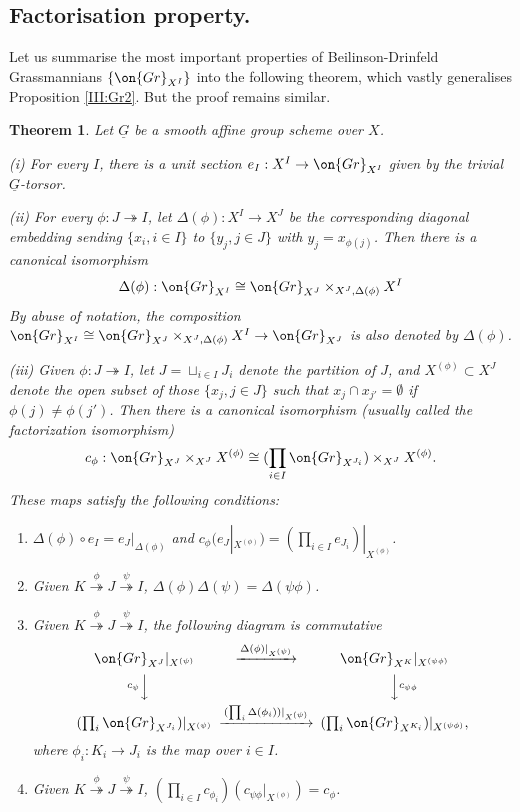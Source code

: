 \documentclass[]{pcmi}
\theoremstyle{plain}
\newtheorem{thm}[equation]{Theorem}
\theoremstyle{remark}
\theoremstyle{definition}
\newcommand{\Gr}{{\on{Gr}}}
\begin{document}
\subsection{Factorisation property.}
Let us summarise the most important properties of Beilinson-Drinfeld Grassmannians $\{\Gr_{X^I}\}$ into the following theorem, which vastly generalises Proposition \ref{III:Gr2}. But the proof remains similar.
\begin{thm}\label{III:factorization} Let $\underline G$ be a smooth affine group scheme over $X$.

(i) For every $I$, there is a unit section $e_I: X^I\to \Gr_{X^I}$ given by the trivial $\underline G$-torsor.

(ii) For every $\phi: J\twoheadrightarrow I$, let $\Delta(\phi):X^I\to X^J$ be the corresponding diagonal embedding sending $\{x_i, i\in I\}$ to $\{y_j, j\in J\}$ with $y_j=x_{\phi(j)}$. Then
there is a canonical isomorphism
\begin{equation}\label{BD restriction}
\Delta(\phi):\Gr_{X^I}\cong \Gr_{X^J}\times_{X^J,\Delta(\phi)}X^I
\end{equation}
By abuse of notation, the composition $\Gr_{X^I}\cong \Gr_{X^J}\times_{X^J,\Delta(\phi)}X^I\to \Gr_{X^J}$ is also denoted by $\Delta(\phi)$.

(iii) Given $\phi: J\twoheadrightarrow  I$, let $J=\sqcup_{i\in I}J_i$ denote the partition of $J$, and $X^{(\phi)}\subset X^J$ denote the open subset of those $\{x_j, j\in J\}$ such that $x_{j}\cap x_{j'}=\emptyset$ if $\phi(j)\neq \phi(j')$. Then there is a canonical isomorphism (usually called the factorization isomorphism)
\begin{equation}\label{BD factorization}
c_\phi: \Gr_{X^J}\times_{X^J}X^{(\phi)}\cong (\prod_{i\in I}\Gr_{X^{J_i}})\times_{X^J}X^{(\phi)}.
\end{equation}
These maps satisfy the following conditions:
\begin{enumerate}
\item $\Delta(\phi)\circ e_I=e_J|_{\Delta(\phi)}$ and $c_\phi (e_J|_{X^{(\phi)}})=(\prod_{i\in I} e_{J_i})|_{X^{(\phi)}}$.
\item Given $K\stackrel{\phi}{\twoheadrightarrow}  J\stackrel{\psi}{\twoheadrightarrow}  I$, $\Delta(\phi)\Delta(\psi)=\Delta(\psi\phi)$.
\item Given $K\stackrel{\phi}{\twoheadrightarrow}  J\stackrel{\psi}{\twoheadrightarrow}  I$, the following diagram is commutative
\[\begin{CD}
\Gr_{X^J}|_{X^{(\psi)}}@>\Delta(\phi)|_{X^{(\psi)}}>>\Gr_{X^K}|_{X^{(\psi\phi)}}\\
@Vc_{\psi} VV@VV c_{\psi\phi}V\\
(\prod_i\Gr_{X^{J_i}})|_{X^{(\psi)}}@>(\prod_{i}\Delta(\phi_i))|_{X^{(\psi)}}>> (\prod_i \Gr_{X^{K_i}})|_{X^{(\psi\phi)}},
\end{CD}\] 
where $\phi_i:K_i\to J_i$ is the map over $i\in I$.
\item Given $K\stackrel{\phi}{\twoheadrightarrow}  J\stackrel{\psi}{\twoheadrightarrow}  I$, $(\prod_{i\in I}c_{\phi_i})(c_{\psi\phi}|_{X^{(\phi)}})=c_{\phi}$.
\end{enumerate}
\end{thm}
\end{document}

